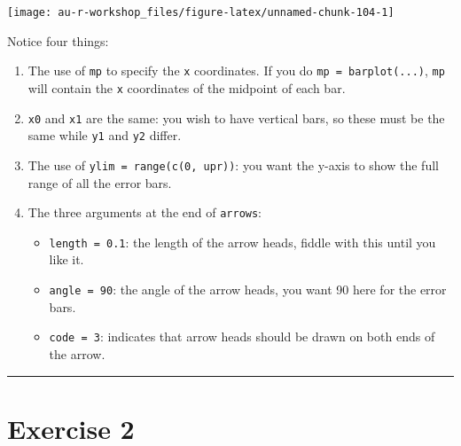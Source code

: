 \documentclass[]{book}
\providecommand{\tightlist}{%
  \setlength{\itemsep}{0pt}\setlength{\parskip}{0pt}}
\theoremstyle{definition}
\theoremstyle{definition}
\theoremstyle{definition}
\theoremstyle{remark}
\begin{document}
\begin{center}\texttt{[image: au-r-workshop\_files/figure-latex/unnamed-chunk-104-1]} \end{center}

Notice four things:

\begin{enumerate}
\def\labelenumi{\arabic{enumi}.}
\tightlist
\item
  The use of \texttt{mp} to specify the \texttt{x} coordinates. If you
  do \texttt{mp\ =\ barplot(...)}, \texttt{mp} will contain the
  \texttt{x} coordinates of the midpoint of each bar.
\item
  \texttt{x0} and \texttt{x1} are the same: you wish to have vertical
  bars, so these must be the same while \texttt{y1} and \texttt{y2}
  differ.
\item
  The use of \texttt{ylim\ =\ range(c(0,\ upr))}: you want the y-axis to
  show the full range of all the error bars.
\item
  The three arguments at the end of \texttt{arrows}:

  \begin{itemize}
  \tightlist
  \item
    \texttt{length\ =\ 0.1}: the length of the arrow heads, fiddle with
    this until you like it.
  \item
    \texttt{angle\ =\ 90}: the angle of the arrow heads, you want 90
    here for the error bars.
  \item
    \texttt{code\ =\ 3}: indicates that arrow heads should be drawn on
    both ends of the arrow.
  \end{itemize}
\end{enumerate}

\begin{center}\rule{0.5\linewidth}{\linethickness}\end{center}

\hypertarget{ex2}{\section*{Exercise 2}\label{ex2}}
\end{document}
